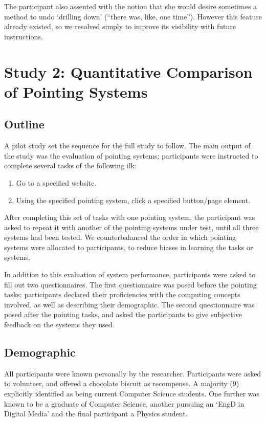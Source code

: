 \documentclass[a4paper, 12pt]{report}
\begin{document}
The participant also assented with the notion that she would desire sometimes a method to undo `drilling down' (``there was, like, one time''). However this feature already existed, so we resolved simply to improve its visibility with future instructions.

\section{Study 2: Quantitative Comparison of Pointing Systems}
\subsection{Outline}
A pilot study set the sequence for the full study to follow. The main output of the study was the evaluation of pointing systems; participants were instructed to complete several tasks of the following ilk:
\begin{enumerate}
\item Go to a specified website.
\item Using the specified pointing system, click a specified button/page element.
\end{enumerate}
After completing this set of tasks with one pointing system, the participant was asked to repeat it with another of the pointing systems under test, until all three systems had been tested. We counterbalanced the order in which pointing systems were allocated to participants, to reduce biases in learning the tasks or systems.

In addition to this evaluation of system performance, participants were asked to fill out two questionnaires. The first questionnaire was posed before the pointing tasks: participants declared their proficiencies with the computing concepts involved, as well as describing their demographic. The second questionnaire was posed after the pointing tasks, and asked the participants to give subjective feedback on the systems they used.

\subsection{Demographic}
All participants were known personally by the researcher. Participants were asked to volunteer, and offered a chocolate biscuit as recompense. A majority (9) explicitly identified as being current Computer Science students. One further was known to be a graduate of Computer Science, another pursuing an `EngD in Digital Media' and the final participant a Physics student.
\end{document}
